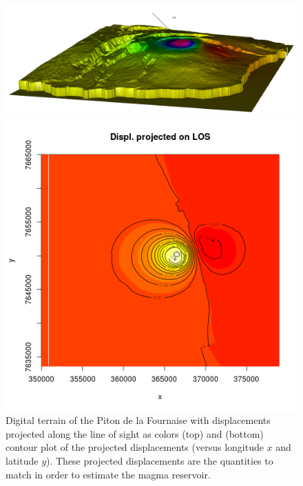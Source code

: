 \documentclass[12pt]{article}
\begin{document}
\begin{figure}
\begin{center}
\begin{minipage}{0.70\textwidth}
\includegraphics[width=\textwidth]{piton_ulos_2.png}
\end{minipage}
\hspace{0.05cm}
\begin{minipage}{0.44\textwidth}
\includegraphics[width=\textwidth]{contour_ulos.png}
\end{minipage}
\end{center}
\caption{Digital terrain of the Piton de la Fournaise with displacements projected along the line of sight as colors (top) 
and (bottom) contour plot of the projected displacements (versus longitude $x$ and latitude $y$). 
These projected displacements are the quantities to match in order to estimate the magma reservoir.}
\label{fig-piton}
\end{figure}
\end{document}
